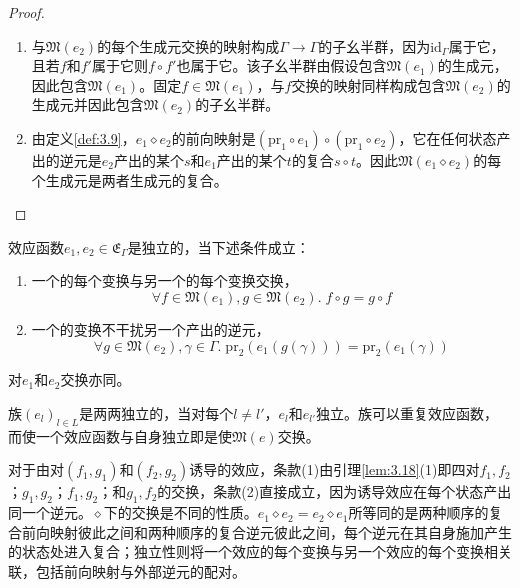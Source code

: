 \begin{proof}
\begin{enumerate}
\item 与$\mathfrak{M}(e_2)$的每个生成元交换的映射构成$\Gamma \to \Gamma$的子幺半群，因为$\mathrm{id}_\Gamma$属于它，且若$f$和$f'$属于它则$f \circ f'$也属于它。该子幺半群由假设包含$\mathfrak{M}(e_1)$的生成元，因此包含$\mathfrak{M}(e_1)$。固定$f \in \mathfrak{M}(e_1)$，与$f$交换的映射同样构成包含$\mathfrak{M}(e_2)$的生成元并因此包含$\mathfrak{M}(e_2)$的子幺半群。
\item 由定义\ref{def:3.9}，$e_1 \diamond e_2$的前向映射是$(\mathrm{pr}_1 \circ e_1) \circ (\mathrm{pr}_1 \circ e_2)$，它在任何状态产出的逆元是$e_2$产出的某个$s$和$e_1$产出的某个$t$的复合$s \circ t$。因此$\mathfrak{M}(e_1 \diamond e_2)$的每个生成元是两者生成元的复合。
\end{enumerate}
\end{proof}

\begin{definition}\label{def:3.19}
效应函数$e_1, e_2 \in \mathfrak{E}_\Gamma$是独立的，当下述条件成立：
\begin{enumerate}
\item 一个的每个变换与另一个的每个变换交换，
\begin{equation}\label{eq:3.18}
\forall f \in \mathfrak{M}(e_1), g \in \mathfrak{M}(e_2).\; f \circ g = g \circ f
\end{equation}
\item 一个的变换不干扰另一个产出的逆元，
\begin{equation}\label{eq:3.19}
\forall g \in \mathfrak{M}(e_2), \gamma \in \Gamma.\; \mathrm{pr}_2(e_1(g(\gamma))) = \mathrm{pr}_2(e_1(\gamma))
\end{equation}
\end{enumerate}
对$e_1$和$e_2$交换亦同。
\end{definition}

族$(e_l)_{l \in L}$是两两独立的，当对每个$l \neq l'$，$e_l$和$e_{l'}$独立。族可以重复效应函数，而使一个效应函数与自身独立即是使$\mathfrak{M}(e)$交换。

对于由对$(f_1, g_1)$和$(f_2, g_2)$诱导的效应，条款(1)由引理\ref{lem:3.18}(1)即四对$f_1, f_2$；$g_1, g_2$；$f_1, g_2$；和$g_1, f_2$的交换，条款(2)直接成立，因为诱导效应在每个状态产出同一个逆元。$\diamond$下的交换是不同的性质。$e_1 \diamond e_2 = e_2 \diamond e_1$所等同的是两种顺序的复合前向映射彼此之间和两种顺序的复合逆元彼此之间，每个逆元在其自身施加产生的状态处进入复合；独立性则将一个效应的每个变换与另一个效应的每个变换相关联，包括前向映射与外部逆元的配对。


